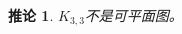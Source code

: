 \documentclass{article}
\begin{document}
\begin{CJK}{UTF8}{gbsn}
  \newtheorem*{cor}{推论}
  \Large
  \begin{cor}
       $K_{3,3}$不是可平面图。
  \end{cor}


\end{CJK}
\end{document}
